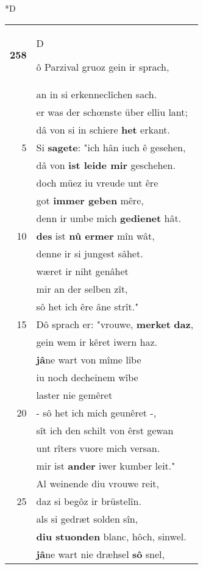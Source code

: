 \documentclass[8pt,a4paper,notitlepage]{article}
\begin{document}
\begin{table}[ht]
\begin{minipage}[t]{0.5\linewidth}
\small
\begin{center}*D
\end{center}
\begin{tabular}{rl}
\textbf{258} & \begin{large}D\end{large}ô Parzival gruoz gein ir sprach,\\ 
 & an in si erkenneclîchen sach.\\ 
 & er was der schœnste über elliu lant;\\ 
 & dâ von si in schiere \textbf{het} erkant.\\ 
5 & Si \textbf{sagete}: "ich hân iuch ê gesehen,\\ 
 & dâ von \textbf{ist leide mir} geschehen.\\ 
 & doch müez iu vreude unt êre\\ 
 & got \textbf{immer geben} mêre,\\ 
 & denn ir umbe mich \textbf{gedienet} hât.\\ 
10 & \textbf{des} ist \textbf{nû ermer} mîn wât,\\ 
 & denne ir si jungest sâhet.\\ 
 & wæret ir niht genâhet\\ 
 & mir an der selben zît,\\ 
 & sô het ich êre âne strît."\\ 
15 & Dô sprach er: "vrouwe, \textbf{merket} \textbf{daz},\\ 
 & gein wem ir kêret iwern haz.\\ 
 & \textbf{jâ}ne wart von mîme lîbe\\ 
 & iu noch decheinem wîbe\\ 
 & laster nie gemêret\\ 
20 & - sô het ich mich geunêret -,\\ 
 & sît ich den schilt von êrst gewan\\ 
 & unt rîters vuore mich versan.\\ 
 & mir ist \textbf{ander} iwer kumber leit."\\ 
 & Al weinende diu vrouwe reit,\\ 
25 & daz si begôz ir brüstelîn.\\ 
 & als si gedræt solden sîn,\\ 
 & \textbf{diu stuonden} blanc, hôch, sinwel.\\ 
 & \textbf{jâ}ne wart nie dræhsel \textbf{sô} snel,\\ 

\end{tabular}
\end{minipage}
\end{table}
\end{document}
